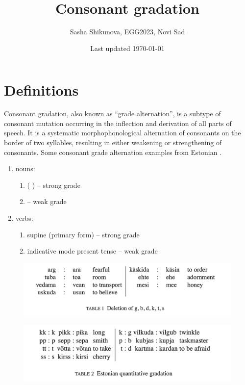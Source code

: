 \documentclass[a4paper, 12pt]{article}
\title{Consonant gradation}
\author{Sasha Shikunova, EGG2023, Novi Sad}
\date{Last updated \today}
\begin{document}
\maketitle

	\section{Definitions}
	
	\ex Consonant gradation, also known as ``grade alternation'', is a subtype of consonant mutation occurring in the inflection and derivation of all parts of speech. It is a systematic morphophonological alternation of consonants on the border of two syllables, resulting in either weakening or strengthening of consonants. 
	\xe
	Some consonant grade alternation examples from Estonian \parencite{trosterud-uibo2005}.
	
	\begin{enumerate}[$\gg$]
		\item nouns: 
			\begin{enumerate}[$\cdot$]
				\item {\Sg} {\Nom} ({\Sg} {\Part}) -- strong grade
				\item {\Sg} {\Gen} -- weak grade
			\end{enumerate}
		\item verbs: 
			\begin{enumerate}[$\cdot$]
				\item supine (primary form) -- strong grade
				\item indicative mode present tense -- weak grade 
			\end{enumerate} 
	\end{enumerate}
	
	\begin{figure}[H]
		\includegraphics[scale=.6]{est-grades1}
	\end{figure}
	
	\begin{figure}[H]
		\includegraphics[scale=.6]{est-grades2}
	\end{figure}
	\parencite[pp. 139--140]{trosterud-uibo2005}
	
\end{document}
